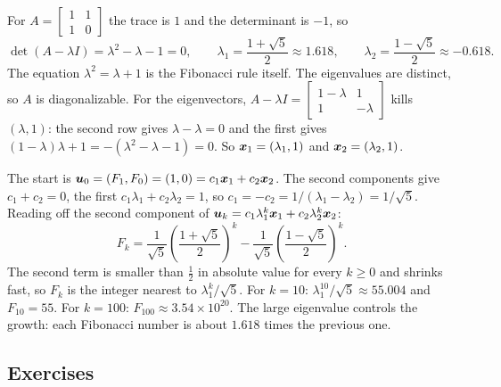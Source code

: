 \begin{example}\label{ex:u24-fibonacci}
For $A=\left[\begin{smallmatrix} 1&1\\ 1&0\end{smallmatrix}\right]$ the trace is $1$ and the
determinant is $-1$, so
\[
  \det(A-\lambda I)=\lambda^{2}-\lambda-1=0,\qquad
  \lambda_1=\frac{1+\sqrt5}{2}\approx1.618,\qquad
  \lambda_2=\frac{1-\sqrt5}{2}\approx-0.618 .
\]
The equation $\lambda^{2}=\lambda+1$ is the Fibonacci rule itself. The eigenvalues are
distinct, so $A$ is diagonalizable. For the eigenvectors,
$A-\lambda I=\left[\begin{smallmatrix} 1-\lambda & 1\\ 1 & -\lambda\end{smallmatrix}\right]$
kills $(\lambda,1)$: the second row gives $\lambda-\lambda=0$ and the first gives
$(1-\lambda)\lambda+1=-(\lambda^{2}-\lambda-1)=0$. So $\boldsymbol{x}_1=(\lambda_1,1)$ and
$\boldsymbol{x}_2=(\lambda_2,1)$.

The start is $\boldsymbol{u}_0=(F_1,F_0)=(1,0)=c_1\boldsymbol{x}_1+c_2\boldsymbol{x}_2$. The second components give
$c_1+c_2=0$, the first $c_1\lambda_1+c_2\lambda_2=1$, so
$c_1=-c_2=1/(\lambda_1-\lambda_2)=1/\sqrt5$. Reading off the second component of
$\boldsymbol{u}_k=c_1\lambda_1^{k}\boldsymbol{x}_1+c_2\lambda_2^{k}\boldsymbol{x}_2$:
\[
  F_k=\frac{1}{\sqrt5}\left(\frac{1+\sqrt5}{2}\right)^{k}-\frac{1}{\sqrt5}\left(\frac{1-\sqrt5}{2}\right)^{k}.
\]
The second term is smaller than $\tfrac12$ in absolute value for every $k\ge0$ and shrinks
fast, so $F_k$ is the integer nearest to $\lambda_1^{k}/\sqrt5$. For $k=10$:
$\lambda_1^{10}/\sqrt5\approx55.004$ and $F_{10}=55$. For $k=100$: $F_{100}\approx3.54\times10^{20}$.
The large eigenvalue controls the growth: each Fibonacci number is about $1.618$ times the
previous one.
\end{example}

\subsection{Exercises}


